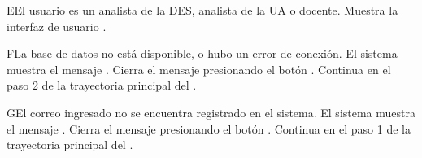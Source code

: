 
\begin{UCtrayectoriaA}{E}{El usuario es un analista de la DES, analista de la UA o docente.}
    \UCpaso Muestra la interfaz de usuario .
\end{UCtrayectoriaA}


\begin{UCtrayectoriaA}{F}{La base de datos no está disponible, o hubo un error de conexión.}
    \UCpaso El sistema muestra el mensaje .
    \UCpaso[\UCactor] Cierra el mensaje presionando el botón .
    \UCpaso Continua en el paso 2 de la trayectoria principal del .
\end{UCtrayectoriaA}


\begin{UCtrayectoriaA}{G}{El correo ingresado no se encuentra registrado en el sistema.}
    \UCpaso El sistema muestra el mensaje .
    \UCpaso[\UCactor] Cierra el mensaje presionando el botón .
    \UCpaso Continua en el paso 1 de la trayectoria principal del .
\end{UCtrayectoriaA}


